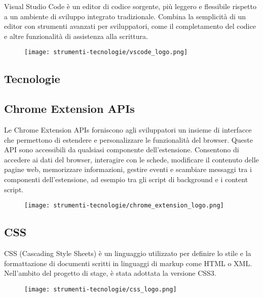 \par Visual Studio Code è un editor di codice sorgente, più leggero e flessibile rispetto a un ambiente di sviluppo integrato tradizionale. Combina la semplicità di un editor con strumenti avanzati per sviluppatori, come il completamento del codice e altre funzionalità di assistenza alla scrittura.

\begin{figure}[H]
    \centering 
    \texttt{[image: strumenti-tecnologie/vscode\_logo.png]} 
\end{figure}

\subsection{Tecnologie}

\subsection*{Chrome Extension APIs}

\par Le Chrome Extension APIs forniscono agli sviluppatori un insieme di interfacce che permettono di estendere e personalizzare le funzionalità del browser. Queste API sono accessibili da qualsiasi componente dell’estensione. Consentono di accedere ai dati del browser, interagire con le schede, modificare il contenuto delle pagine web, memorizzare informazioni, gestire eventi e scambiare messaggi tra i componenti dell’estensione, ad esempio tra gli script di background e i content script.

\begin{figure}[H]
    \centering 
    \texttt{[image: strumenti-tecnologie/chrome\_extension\_logo.png]} 
\end{figure}

\subsection*{CSS}

\par CSS (Cascading Style Sheets) è un linguaggio utilizzato per definire lo stile e la formattazione di documenti scritti in linguaggi di markup come HTML o XML. Nell’ambito del progetto di stage, è stata adottata la versione CSS3.

\begin{figure}[H]
    \centering 
    \texttt{[image: strumenti-tecnologie/css\_logo.png]} 
\end{figure}

